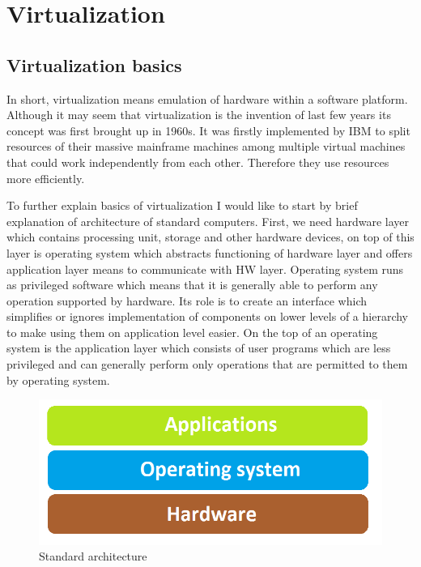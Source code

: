 
\chapter{Virtualization}

\section{Virtualization basics}
In short, virtualization means emulation of hardware within a software platform. Although it may seem that virtualization is the invention of last few years its concept was first brought up in 1960s. It was firstly implemented by IBM to split resources of their massive mainframe machines among multiple virtual machines that could work independently from each other. Therefore they use resources more efficiently.

To further explain basics of virtualization I would like to start by brief explanation of architecture of standard computers. First, we need hardware layer which contains processing unit, storage and other hardware devices, on top of this layer is operating system which abstracts functioning of hardware layer and offers application layer means to communicate with HW layer. Operating system runs as privileged software which means that it is generally able to perform any operation supported by hardware. Its role is to create an interface which simplifies or ignores implementation of components on lower levels of a hierarchy to make using them on application level easier. On the top of an operating system is the application layer which consists of user programs which are less privileged and can generally perform only operations that are permitted to them by operating system.

\begin{figure}[H]
\centering
\includegraphics[scale=0.5]{klasika.png}
\caption{Standard architecture}
\end{figure}

